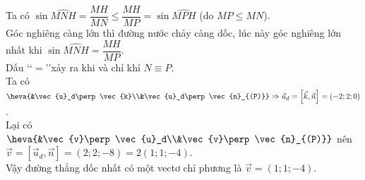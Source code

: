 \begin{ex}
{\begin{itemchoice}
			Ta có $\sin \widehat{MNH} = \dfrac{MH}{MN} \le \dfrac{MH}{MP}=\sin \widehat{MPH}$ (do $MP \le MN$).\\ 
			Góc nghiêng càng lớn thì đường nước chảy càng dốc, lúc này góc nghiêng lớn nhất khi \break $\sin \widehat{MNH} = \dfrac{MH}{MP}$.\\
			Dấu \lq\lq$=$\rq\rq xảy ra khi và chỉ khỉ $N \equiv P$.\\
			Ta có $\heva{&\vec{u}_d\perp \vec{k}\\&\vec{u}_d\perp \vec{n}_{(P)}}\Rightarrow \vec{u}_d = \left[\vec{k}, \vec{n}\right]=(-2;2;0)$.\\
			Lại có $\heva{&\vec{v}\perp \vec{u}_d\\&\vec{v}\perp \vec{n}_{(P)}}$ nên
			$\vec{v} = \left[\vec{u}_d, \vec{n}\right]=(2;2;-8)=2(1;1;-4)$.\\
			Vậy đường thẳng dốc nhất có một vectơ chỉ phương là $\vec{v}=(1;1;-4)$.	
		\end{itemchoice}
	}
\end{ex}

